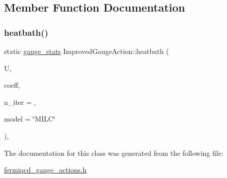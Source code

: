 \subsection{Member Function Documentation}
\mbox{\label{class_improved_gauge_action_a02e55d57665313eb939b9b6e77697680}} 
\subsubsection{\texorpdfstring{heatbath()}{heatbath()}}
{\footnotesize\ttfamily static \hyperlink{classgauge__stats}{gauge\+\_\+stats} Improved\+Gauge\+Action\+::heatbath (\begin{DoxyParamCaption}\item[{\hyperlink{classgauge__field}{gauge\+\_\+field} \&}]{U,  }\item[{\hyperlink{classcoefficients}{coefficients} \&}]{coeff,  }\item[{int}]{n\+\_\+iter = {},  }\item[{string}]{model = {\ttfamily \char`\"{}MILC\char`\"{}} }\end{DoxyParamCaption})\hspace{0.3cm}{\ttfamily [inline]}, {\ttfamily [static]}}



The documentation for this class was generated from the following file\+:\begin{DoxyCompactItemize}
\item 
\hyperlink{fermiqcd__gauge__actions_8h}{fermiqcd\+\_\+gauge\+\_\+actions.\+h}\end{DoxyCompactItemize}

